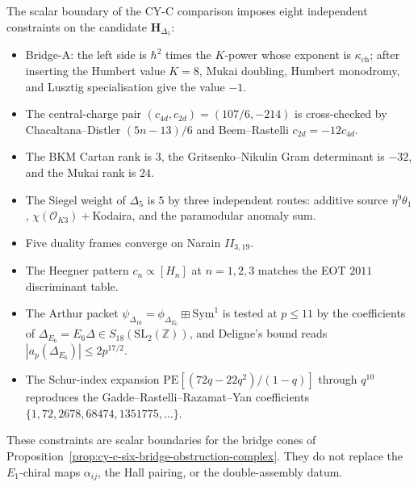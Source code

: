 \begin{remark}
\label{rem:cy-c-six-routes-unified-comparison}
The scalar boundary of the CY-C comparison imposes eight independent
constraints on the candidate \(\mathbf H_{\Delta_5}\):
\begin{itemize}
\item Bridge-A: the left side is $\hbar^2$ times the $K$-power whose exponent is $\kappa_{\mathrm{ch}}$; after inserting the Humbert value $K=8$, Mukai doubling, Humbert monodromy, and Lusztig specialisation give the value $-1$.
\item The central-charge pair $(c_{4d}, c_{2d}) = (107/6, -214)$ is cross-checked by Chacaltana--Distler $(5n-13)/6$ and Beem--Rastelli $c_{2d} = -12 c_{4d}$.
\item The BKM Cartan rank is $3$, the Gritsenko--Nikulin Gram determinant is $-32$, and the Mukai rank is $24$.
\item The Siegel weight of $\Delta_5$ is $5$ by three independent routes: additive source $\eta^9\theta_1$, $\chi(\mathcal{O}_{K3})+$Kodaira, and the paramodular anomaly sum.
\item Five duality frames converge on Narain $II_{3,19}$.
\item The Heegner pattern $c_n \propto [H_n]$ at $n = 1,2,3$ matches the EOT $2011$ discriminant table.
\item The Arthur packet $\psi_{\Delta_{10}} = \phi_{\Delta_{E_6}}\boxplus\mathrm{Sym}^1$ is tested at $p\le 11$ by the coefficients of $\Delta_{E_6}=E_6\Delta\in S_{18}(\mathrm{SL}_2(\mathbb Z))$, and Deligne's bound reads $|a_p(\Delta_{E_6})|\le 2p^{17/2}$.
\item The Schur-index expansion $\mathrm{PE}[(72q-22q^2)/(1-q)]$ through $q^{10}$ reproduces the Gadde--Rastelli--Razamat--Yan coefficients $\{1,72,2678,68474,1351775,\ldots\}$.
\end{itemize}
These constraints are scalar boundaries for the bridge cones of
Proposition~\ref{prop:cy-c-six-bridge-obstruction-complex}. They do not
replace the \(E_1\)-chiral maps \(\alpha_{ij}\), the Hall pairing, or
the double-assembly datum.
\end{remark}

